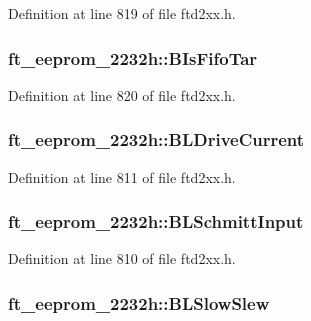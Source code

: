 Definition at line 819 of file ftd2xx.h.\hypertarget{structft__eeprom__2232h_a88d403ec9e1b8bdb88160fd3b3129191}{
\subsubsection[{BIsFifoTar}]{ {\bf ft\_\-eeprom\_\-2232h::BIsFifoTar}}}
\label{structft__eeprom__2232h_a88d403ec9e1b8bdb88160fd3b3129191}


Definition at line 820 of file ftd2xx.h.\hypertarget{structft__eeprom__2232h_a964876406798f7c704764488c04b1530}{
\subsubsection[{BLDriveCurrent}]{ {\bf ft\_\-eeprom\_\-2232h::BLDriveCurrent}}}
\label{structft__eeprom__2232h_a964876406798f7c704764488c04b1530}


Definition at line 811 of file ftd2xx.h.\hypertarget{structft__eeprom__2232h_a5f44424e437a8f95a08123f35c813e17}{
\subsubsection[{BLSchmittInput}]{ {\bf ft\_\-eeprom\_\-2232h::BLSchmittInput}}}
\label{structft__eeprom__2232h_a5f44424e437a8f95a08123f35c813e17}


Definition at line 810 of file ftd2xx.h.\hypertarget{structft__eeprom__2232h_ac04377c073041676bf56e25152572952}{
\subsubsection[{BLSlowSlew}]{ {\bf ft\_\-eeprom\_\-2232h::BLSlowSlew}}}
\label{structft__eeprom__2232h_ac04377c073041676bf56e25152572952}



